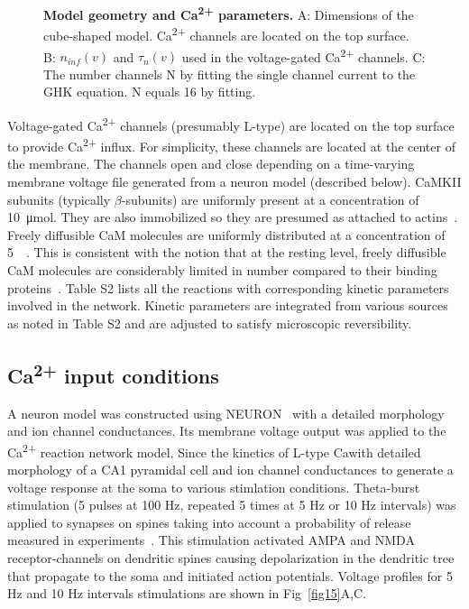 \documentclass[10pt,letterpaper]{article}
\begin{document}
\begin{figure}[!h]
	\caption{{\bf Model geometry and Ca\textsuperscript{2+} parameters.}
	A: Dimensions of the cube-shaped model. Ca\textsuperscript{2+} channels are located on the top surface. 
	B: $n_{inf}(v)$ and $\tau_n(v)$ used in the voltage-gated Ca\textsuperscript{2+} channels.
	C: The number channels N by fitting the single channel current to the GHK equation. N equals 16 by fitting. 
	}
\label{fig14}
\end{figure}

Voltage-gated Ca\textsuperscript{2+} channels (presumably L-type) are located on the top surface to provide Ca\textsuperscript{2+} influx. For simplicity, these channels are located at the center of the membrane. The channels open and close depending on a time-varying membrane voltage file generated from a neuron model (described below). CaMKII subunits (typically $\beta$-subunits) are uniformly present at a concentration of \SI{10}{\umol}. They are also immobilized so they are presumed as attached to actins~\cite{Li:2016cq}. Freely diffusible CaM molecules are uniformly distributed at a concentration of \SI{5}{\micro\Molar}. This is consistent with the notion that at the resting level, freely diffusible CaM molecules are considerably limited in number compared to their binding proteins~\cite{Tran:2003fs,2008BpJ....95.6002S,LubyPhelps:1995kl}. Table S2 lists all the reactions with corresponding kinetic parameters involved in the network. Kinetic parameters are integrated from various sources as noted in Table S2 and are adjusted to satisfy microscopic reversibility. 

\subsection*{Ca\textsuperscript{2+} input conditions}

A neuron model was constructed using NEURON~\cite{Carnevale:2006iv} with a detailed morphology and ion channel conductances. Its membrane voltage output was applied to the Ca\textsuperscript{2+} reaction network model. Since the kinetics of L-type Ca\textsuperscri with detailed morphology of a CA1 pyramidal cell and ion channel conductances to generate a voltage response at the soma to various stimlation conditions. Theta-burst stimulation (5 pulses at 100 Hz, repeated 5 times at 5 Hz or 10 Hz intervals) was applied to synapses on spines taking into account a probability of release measured in experiments~\cite{Grover:2009hb}. This stimulation activated AMPA and NMDA receptor-channels on dendritic spines causing depolarization in the dendritic tree that propagate to the soma and initiated action potentials. Voltage profiles for 5 Hz and 10 Hz intervals stimulations are shown in Fig~\ref{fig15}A,C. 
\end{document}

